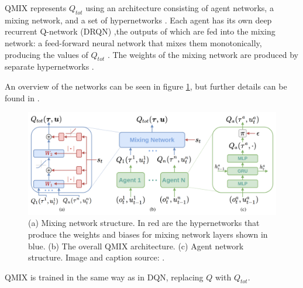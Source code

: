 QMIX represents $Q_{tot}$ using an architecture
consisting of agent networks, a mixing network, and a set
of hypernetworks \cite{hypernetworks} \cite{qmixcite}. Each agent has its own deep recurrent Q-network (DRQN) \cite{dqrn},the outputs of which are fed into the mixing network: a feed-forward neural network that mixes them
monotonically, producing the values of $Q_{tot}$ \cite{qmixcite}. The weights of the mixing network are produced by separate hypernetworks \cite{qmixcite}.

An overview of the networks can be seen in figure \ref{fig:qmix}, but further details can be found in \cite{qmixcite}.

\begin{figure}
    \centering
    \hbox{\hspace{-2.5em}\includegraphics[scale = 0.18]{images/qmix.png}}
    \caption{(a) Mixing network structure. In red are the hypernetworks that produce the weights and biases for mixing network layers shown
in blue. (b) The overall QMIX architecture. (c) Agent network structure. Image and caption source: \cite{qmixcite}.}
    \label{fig:qmix}
\end{figure}





QMIX is trained in the same way as in DQN, replacing $Q$ with $Q_{tot}$.

